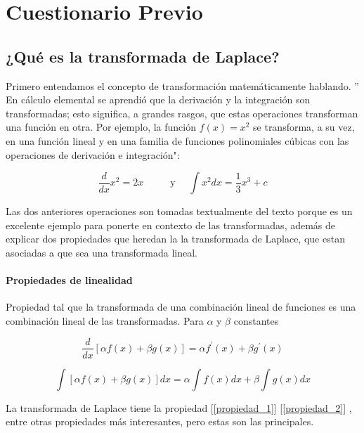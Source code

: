\section{Cuestionario Previo}

\noindent \justifying

\subsection{¿Qué es la transformada de Laplace?}

Primero entendamos el concepto de transformación matemáticamente hablando.
'' En cálculo elemental se aprendió que la derivación y la integración son transformadas; esto significa, a grandes rasgos, que estas operaciones transforman una función en otra. Por ejemplo, la función $f(x)=x^{2}$ se transforma, a su vez, en una función lineal y en una familia de funciones polinomiales cúbicas con las operaciones de derivación e integración":


\begin{equation}
		\frac{d}{d x} x^{2}=2 x \hspace{1cm}
		\text { y } \quad \int x^{2} d x=\frac{1}{3} x^{3}+c
\end{equation}

Las dos anteriores operaciones son   tomadas textualmente del texto  porque es un excelente ejemplo para ponerte en contexto de las transformadas, además de explicar dos propiedades que heredan la la transformada de Laplace, que estan asociadas a que sea una transformada lineal.

\paragraph*{Propiedades de linealidad}

Propiedad  tal que la transformada de una combinación lineal de funciones es una combinación lineal de las transformadas. Para $\alpha$ y $\beta$ constantes

\begin{equation}
	\frac{d}{d x}[\alpha f(x)+\beta g(x)]=\alpha f^{\prime}(x)+\beta g^{\prime}(x)
	\label{propiedad_1}
\end{equation}

\begin{equation}
	\int[\alpha f(x)+\beta g(x)] d x=\alpha \int f(x) d x+\beta \int g(x) d x
	\label{propiedad_2}
\end{equation}

La transformada de Laplace tiene la propiedad [\ref{propiedad_1}] [\ref{propiedad_2}] , entre otras propiedades más interesantes, pero estas son las principales.


